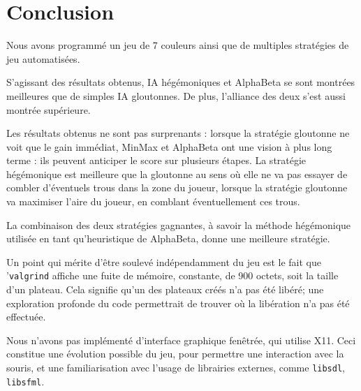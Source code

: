 \documentclass[a4paper]{article}
\begin{document}
    \section{Conclusion}
    Nous avons programmé un jeu de 7 couleurs ainsi que de multiples stratégies 
de jeu automatisées. 
    
    S'agissant des résultats obtenus, IA hégémoniques et AlphaBeta 
se sont montrées meilleures que de simples IA gloutonnes. De plus, l'alliance 
des deux s'est aussi montrée supérieure.

Les résultats obtenus ne sont pas surprenants : lorsque la stratégie gloutonne 
ne voit que le gain immédiat, MinMax et AlphaBeta ont une vision à plus long 
terme : ils peuvent anticiper le score sur plusieurs étapes. La stratégie 
hégémonique est meilleure que la gloutonne au sens où elle ne va pas essayer de 
combler d'éventuels trous dans la zone du joueur, lorsque la stratégie 
gloutonne va maximiser l'aire du joueur, en comblant éventuellement ces trous.

La combinaison des deux stratégies gagnantes, à savoir la méthode hégémonique 
utilisée en tant qu'heuristique de AlphaBeta, donne une meilleure stratégie.

Un point qui mérite d'être soulevé indépendamment du jeu est 
le fait que '\texttt{valgrind} affiche une fuite de mémoire, constante, de 900 
octets, soit la taille d'un plateau. Cela signifie qu'un des plateaux créés n'a 
pas été libéré; une exploration profonde du code permettrait de trouver où la 
libération n'a pas été effectuée.

Nous n'avons pas implémenté d'interface graphique fenêtrée, qui utilise X11. 
Ceci constitue une évolution possible du jeu, pour permettre une interaction 
avec la souris, et une familiarisation avec l'usage de librairies externes, 
comme \texttt{libsdl}, \texttt{libsfml}.

    
\end{document}
